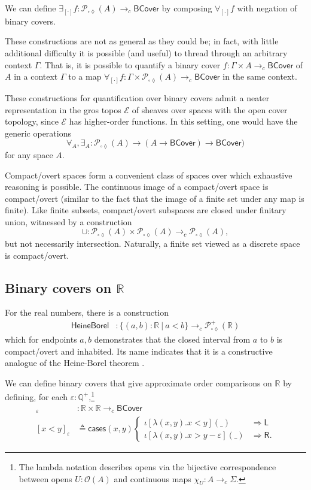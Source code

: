 \documentclass[conference]{IEEEtran}
\newcommand{\Viet}{\mathcal{P}_{\square\lozenge}}
\newcommand{\cto}{\to_c}
\newcommand{\R}{\mathbb{R}}
\newcommand{\rat}{\mathbb{Q}}
\newcommand{\suchthat}{\ |\ }
\newcommand{\Open}[1]{\mathcal{O}({#1})}
\newcommand{\wildcard}{\_}
\newcommand{\oinclf}[1]{\iota[{#1}]}
\newcommand{\oincl}[2]{\oinclf{#1} \left({#2}\right)}
\newcommand{\Branch}{\Rightarrow}
\newcommand{\BCover}{\mathsf{BCover}}
\begin{document}
We can define $\exists_{[\cdot]} f : \Viet(A) \cto \BCover$ by composing $\forall_{[\cdot]} f$ with negation of binary covers.

These constructions are not as general as they could be; in fact, with little additional difficulty it is possible (and useful) to thread through an arbitrary context $\Gamma$. That is, it is possible to quantify a binary cover $f : \Gamma \times A \cto \BCover$ of $A$ in a context $\Gamma$ to a map $\forall_{[\cdot]}f : \Gamma \times \Viet(A) \cto \BCover$ in the same context.

These constructions for quantification over binary covers admit a neater representation in the gros topos $\mathcal{E}$ of sheaves over spaces with the open cover topology, since $\mathcal{E}$ has higher-order functions. In this setting, one would have the generic operations 
\[
\forall_A, \exists_A : \Viet(A) \to (A \to \BCover) \to \BCover)
\]
for any space $A$.

Compact/overt spaces form a convenient class of spaces over which exhaustive reasoning is possible. The continuous image of a compact/overt space is compact/overt (similar to the fact that the image of a finite set under any map is finite). Like finite subsets, compact/overt subspaces are closed under finitary union, witnessed by a construction
\[
\cup : \Viet(A) \times \Viet(A) \cto \Viet(A),
\]
but not necessarily intersection. Naturally, a finite set viewed as a discrete space is compact/overt.

\subsection{Binary covers on $\R$}

For the real numbers, there is a construction
\begin{align*}
\mathsf{HeineBorel} &: \{ (a, b) : \R \suchthat a < b \} \cto \Viet^+(\R)
\end{align*}
which for endpoints $a, b$ demonstrates that the closed interval from $a$ to $b$ is compact/overt and inhabited. Its name indicates that it is a constructive analogue of the Heine-Borel theorem \cite{vickersmetric2}.

We can define binary covers that give approximate order comparisons on $\R$ by defining, for each $\varepsilon : \rat^+$,\footnote{The lambda notation describes opens via the bijective correspondence between opens $U : \Open{A}$ and continuous maps $\chi_U : A \cto \Sigma$.}
\begin{align*}
[ \cdot < \cdot ]_\varepsilon &: \R \times \R \cto \BCover
\\ [x < y]_\varepsilon &\triangleq \mathsf{cases}(x, y)
\begin{cases}
\oincl{\lambda (x, y). x < y}{\wildcard} &\Branch \mathsf{L}
\\ \oincl{\lambda (x, y). x > y - \varepsilon}{\wildcard} &\Branch \mathsf{R}.
\end{cases}
\end{align*}
\end{document}
